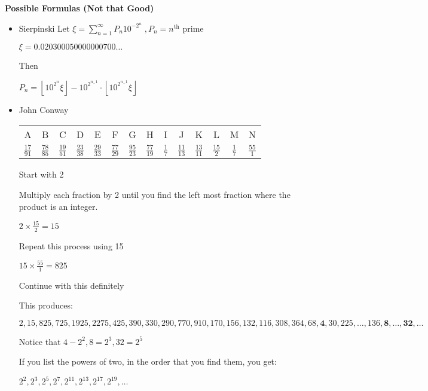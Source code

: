 \documentclass[fleqn,letterpaper,10pt,twoside]{report}
\theoremstyle{plain}
\theoremstyle{definition}
\theoremstyle{remark}
\begin{document}
\textbf{Possible Formulas (Not that Good)}
\begin{itemize}
   \item{Sierpinski} \newline
      Let \(\xi = \sum\limits_{n=1}^\infty P_n10^{-2^n} \;, P_n = n^{\text{th}}\) prime

      \(\xi = 0.020300050000000700\ldots\)

      Then

      \(P_n = \left \lfloor{10^{2^n} \xi} \right \rfloor - 10^{2^{n_-1}} \cdot
      \left \lfloor{10^{2^{n_-1}} \xi} \right \rfloor \)

   \item{John Conway}
      \begin{center}
      \begin{tabular}{cccccccccccccc}
         A&B&C&D&E&F&G&H&I&J&K&L&M&N \\
         \(\frac{17}{91}\) &
         \(\frac{78}{85}\) &
         \(\frac{19}{51}\) &
         \(\frac{23}{38}\) &
         \(\frac{29}{33}\) &
         \(\frac{77}{29}\) &
         \(\frac{95}{23}\) &
         \(\frac{77}{19}\) &
         \(\frac{1 }{7 }\) &
         \(\frac{11}{13}\) &
         \(\frac{13}{11}\) &
         \(\frac{15}{2 }\) &
         \(\frac{1 }{7 }\) &
         \(\frac{55}{1 }\) \\
      \end{tabular}
      \end{center}

      Start with 2

      Multiply each fraction by 2 until you find the left most fraction where the product is an integer.

      \(2 \times \frac{15}{2} = 15\)

      Repeat this process using 15

      \(15 \times \frac{55}{1} = 825\)

      Continue with this definitely

      This produces:

      \(2,15,825,725,1925,2275,425,390,330,290,770,910,170,156,132,116,308,364,68,\boldsymbol{4},30,225,\ldots,136,\boldsymbol{8},\ldots,\boldsymbol{32},\ldots\)

      Notice that \(4 - 2^2, 8 = 2^3, 32 = 2^5\)

      If you list the powers of two, in the order that you find them, you get:

      \(2^2, 2^3, 2^5, 2^7, 2^11, 2^13, 2^17, 2^19, \ldots\)

\end{itemize}
\end{document}
